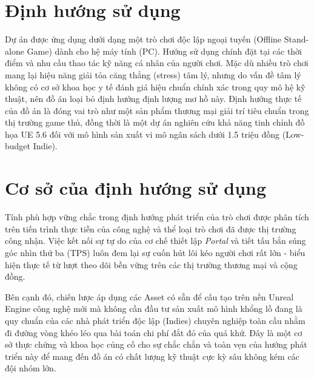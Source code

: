 \documentclass[../DoAn.tex]{subfiles}
\begin{document}
\section{Định hướng sử dụng}
\label{section:2.3}
Dự án được ứng dụng dưới dạng một trò chơi độc lập ngoại tuyến (Offline Stand-alone Game) dành cho hệ máy tính (PC). Hướng sử dụng chính đặt tại các thời điểm và nhu cầu thao tác kỹ năng cá nhân của người chơi. Mặc dù nhiều trò chơi mang lại hiệu năng giải tỏa căng thẳng (stress) tâm lý, nhưng do vấn đề tâm lý không có cơ sở khoa học y tế đánh giá hiệu chuẩn chính xác trong quy mô hệ kỹ thuật, nên đồ án loại bỏ định hướng định lượng mơ hồ này. Định hướng thực tế của đồ án là đóng vai trò như một sản phẩm thương mại giải trí tiêu chuẩn trong thị trường game thủ, đồng thời là một dự án nghiên cứu khả năng tinh chỉnh đồ họa UE 5.6 đối với mô hình sản xuất vi mô ngân sách dưới 1.5 triệu đồng (Low-budget Indie).

\section{Cơ sở của định hướng sử dụng}
\label{section:2.4}
Tính phù hợp vững chắc trong định hướng phát triển của trò chơi được phân tích trên tiến trình thực tiễn của công nghệ và thể loại trò chơi đã được thị trường công nhận. Việc kết nối sự tự do của cơ chế thiết lập \textit{Portal} và tiết tấu bắn súng góc nhìn thứ ba (TPS) luôn đem lại sự cuốn hút lôi kéo người chơi rất lớn - biểu hiện thực tế từ lượt theo dõi bền vững trên các thị trường thương mại và cộng đồng.

Bên cạnh đó, chiến lược áp dụng các Asset có sẵn để cấu tạo trên nền Unreal Engine công nghệ mới mà không cần đầu tư sản xuất mô hình khổng lồ đang là quy chuẩn của các nhà phát triển độc lập (Indies) chuyên nghiệp toàn cầu nhằm đi đường vòng khéo léo qua bài toán chi phí đắt đỏ của quá khứ. Đây là một cơ sở thực chứng và khoa học củng cố cho sự chắc chắn và toàn vẹn của hướng phát triển này để mang đến đồ án có chất lượng kỹ thuật cực kỳ sâu không kém các đội nhóm lớn.

\end{document}
